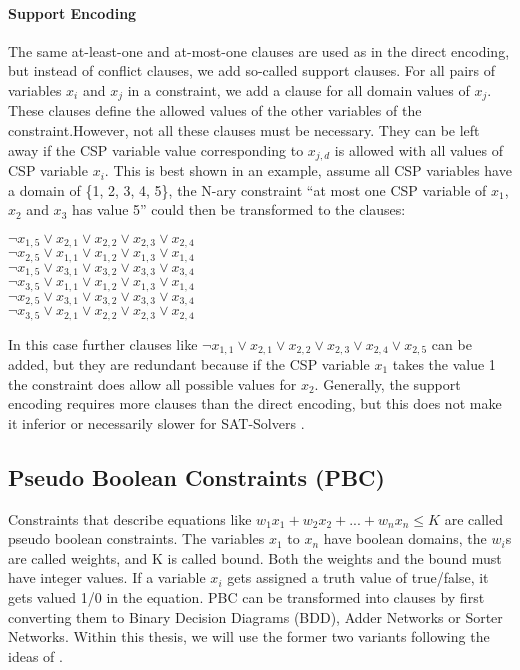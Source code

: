 \paragraph{Support Encoding \cite{kasif1990OnTheParallelComplexityOfDiscreteRelaxationInConstraintSatisfactionNetworks}\cite{gent20002ArcConsistencyInSAT}}
The same at-least-one and at-most-one clauses are used as in the direct encoding, but instead of conflict clauses, we add so-called support clauses. For all pairs of variables $x_i$ and $x_j$ in a constraint, we add a clause for all domain values of $x_j$. These clauses define the allowed values of the other variables of the constraint.However, not all these clauses must be necessary. They can be left away if the CSP variable value corresponding to $x_{j,d}$ is allowed with all values of CSP variable $x_i$. 
This is best shown in an example, assume all CSP variables have a domain of \{1, 2, 3, 4, 5\}, the N-ary constraint ``at most one CSP variable of $x_1$, $x_2$ and $x_3$ has value 5” could then be transformed to the clauses:
\begin{center}
 $\neg x_{1,5} \lor x_{2,1} \lor x_{2,2} \lor x_{2,3} \lor x_{2,4}$\\
 $\neg x_{2,5} \lor x_{1,1} \lor x_{1,2} \lor x_{1,3} \lor x_{1,4}$\\
 $\neg x_{1,5} \lor x_{3,1} \lor x_{3,2} \lor x_{3,3} \lor x_{3,4}$\\
 $\neg x_{3,5} \lor x_{1,1} \lor x_{1,2} \lor x_{1,3} \lor x_{1,4}$\\
 $\neg x_{2,5} \lor x_{3,1} \lor x_{3,2} \lor x_{3,3} \lor x_{3,4}$\\
 $\neg x_{3,5} \lor x_{2,1} \lor x_{2,2} \lor x_{2,3} \lor x_{2,4}$\\
\end{center}
In this case further clauses like $\neg x_{1,1} \lor x_{2,1} \lor x_{2,2} \lor x_{2,3} \lor x_{2,4} \lor x_{2,5}$ can be added, but they are redundant because if the CSP variable $x_1$ takes the value 1 the constraint does allow all possible values for $x_2$. Generally, the support encoding requires more clauses than the direct encoding, but this does not make it inferior or necessarily slower for SAT-Solvers \cite{gent20002ArcConsistencyInSAT}. 


\subsection{Pseudo Boolean Constraints (PBC)}
Constraints that describe equations like $w_1x_1+w_2x_2+...+w_nx_n \leq K$ are called pseudo boolean constraints. The variables $x_1$ to $x_n$ have boolean domains, the $w_i$s are called weights, and K is called bound. Both the weights and the bound must have integer values. If a variable $x_i$ gets assigned a truth value of true/false, it gets valued 1/0 in the equation. PBC can be transformed into clauses by first converting them to Binary Decision Diagrams (BDD), Adder Networks or Sorter Networks. Within this thesis, we will use the former two variants following the ideas of \cite{Een2006TranslatingPC}.

